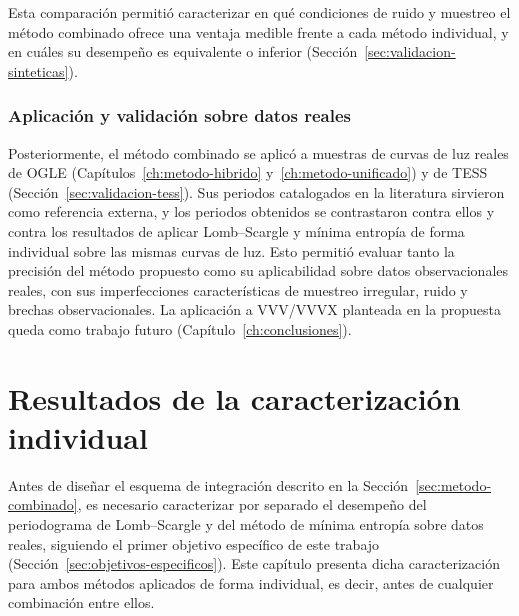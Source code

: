 \documentclass[12pt,letterpaper,oneside]{book}
\begin{document}
Esta comparaci\'on permiti\'o caracterizar en qu\'e condiciones de ruido y muestreo el m\'etodo combinado ofrece una ventaja medible frente a cada m\'etodo individual, y en cu\'ales su desempe\~no es equivalente o inferior (Secci\'on~\ref{sec:validacion-sinteticas}).

\subsection{Aplicaci\'on y validaci\'on sobre datos reales}

Posteriormente, el m\'etodo combinado se aplic\'o a muestras de curvas de luz reales de OGLE (Cap\'itulos~\ref{ch:metodo-hibrido} y~\ref{ch:metodo-unificado}) y de TESS (Secci\'on~\ref{sec:validacion-tess}). Sus periodos catalogados en la literatura sirvieron como referencia externa, y los periodos obtenidos se contrastaron contra ellos y contra los resultados de aplicar Lomb--Scargle y m\'inima entrop\'ia de forma individual sobre las mismas curvas de luz. Esto permiti\'o evaluar tanto la precisi\'on del m\'etodo propuesto como su aplicabilidad sobre datos observacionales reales, con sus imperfecciones caracter\'isticas de muestreo irregular, ruido y brechas observacionales. La aplicaci\'on a VVV/VVVX planteada en la propuesta queda como trabajo futuro (Cap\'itulo~\ref{ch:conclusiones}).


\chapter{Resultados de la caracterizaci\'on individual}
\label{ch:resultados}

Antes de dise\~nar el esquema de integraci\'on descrito en la Secci\'on~\ref{sec:metodo-combinado}, es necesario caracterizar por separado el desempe\~no del periodograma de Lomb--Scargle y del m\'etodo de m\'inima entrop\'ia sobre datos reales, siguiendo el primer objetivo espec\'ifico de este trabajo (Secci\'on~\ref{sec:objetivos-especificos}). Este cap\'itulo presenta dicha caracterizaci\'on para ambos m\'etodos aplicados de forma individual, es decir, antes de cualquier combinaci\'on entre ellos.
\end{document}
